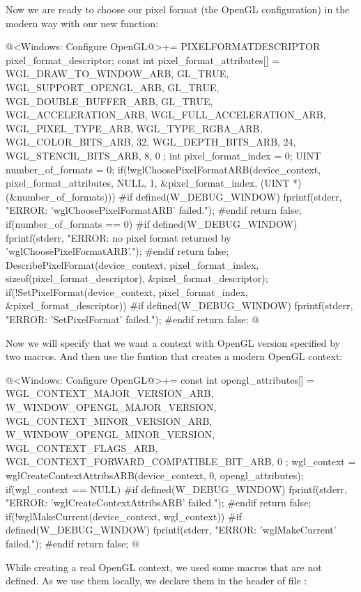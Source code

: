 Now we are ready to choose our pixel format (the OpenGL configuration)
in the modern way with our new function:

\iniciocodigo
@<Windows: Configure OpenGL@>+=
{
  PIXELFORMATDESCRIPTOR pixel_format_descriptor;
  const int pixel_format_attributes[] = {
    WGL_DRAW_TO_WINDOW_ARB, GL_TRUE,
    WGL_SUPPORT_OPENGL_ARB, GL_TRUE,
    WGL_DOUBLE_BUFFER_ARB, GL_TRUE,
    WGL_ACCELERATION_ARB, WGL_FULL_ACCELERATION_ARB,
    WGL_PIXEL_TYPE_ARB, WGL_TYPE_RGBA_ARB,
    WGL_COLOR_BITS_ARB, 32,
    WGL_DEPTH_BITS_ARB, 24,
    WGL_STENCIL_BITS_ARB, 8,
    0 };
  int pixel_format_index = 0;
  UINT number_of_formats = 0;
  if(!wglChoosePixelFormatARB(device_context, pixel_format_attributes, NULL, 1,
                              &pixel_format_index,
                              (UINT *) (&number_of_formats))){
#if defined(W_DEBUG_WINDOW)
     fprintf(stderr, "ERROR: 'wglChoosePixelFormatARB' failed.\n");
#endif
     return false;
  }
  if(number_of_formats == 0){
#if defined(W_DEBUG_WINDOW)
     fprintf(stderr,
             "ERROR: no pixel format returned by 'wglChoosePixelFormatARB'.\n");
#endif
     return false;
  }
  DescribePixelFormat(device_context, pixel_format_index,
                      sizeof(pixel_format_descriptor), &pixel_format_descriptor);
  if(!SetPixelFormat(device_context, pixel_format_index,
                     &pixel_format_descriptor)){
#if defined(W_DEBUG_WINDOW)
    fprintf(stderr, "ERROR: 'SetPixelFormat' failed.\n");
#endif
    return false;
  } 
}
@
\fimcodigo


Now we will specify that we want a context with OpenGL version
specified by two macros. And then use the funtion that creates a
modern OpenGL context:

\iniciocodigo
@<Windows: Configure OpenGL@>+=
{
  const int opengl_attributes[] = {
    WGL_CONTEXT_MAJOR_VERSION_ARB, W_WINDOW_OPENGL_MAJOR_VERSION,
    WGL_CONTEXT_MINOR_VERSION_ARB, W_WINDOW_OPENGL_MINOR_VERSION,
    WGL_CONTEXT_FLAGS_ARB, WGL_CONTEXT_FORWARD_COMPATIBLE_BIT_ARB,
    0 };
  wgl_context = wglCreateContextAttribsARB(device_context, 0, opengl_attributes);
  if(wgl_context == NULL){
#if defined(W_DEBUG_WINDOW)
    fprintf(stderr, "ERROR: 'wglCreateContextAttribsARB' failed.\n");
#endif
    return false;
  }
  if(!wglMakeCurrent(device_context, wgl_context)){
#if defined(W_DEBUG_WINDOW)
    fprintf(stderr, "ERROR: 'wglMakeCurrent' failed.\n");
#endif
    return false;
  }
}
@
\fimcodigo

While creating a real OpenGL context, we used some macros that are not
defined. As we use them locally, we declare them in the header of file
:

